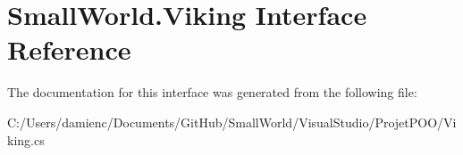 \hypertarget{interface_small_world_1_1_viking}{\section{Small\-World.\-Viking Interface Reference}
\label{interface_small_world_1_1_viking}
}


The documentation for this interface was generated from the following file\-:\begin{DoxyCompactItemize}
\item 
C\-:/\-Users/damienc/\-Documents/\-Git\-Hub/\-Small\-World/\-Visual\-Studio/\-Projet\-P\-O\-O/Viking.\-cs\end{DoxyCompactItemize}
